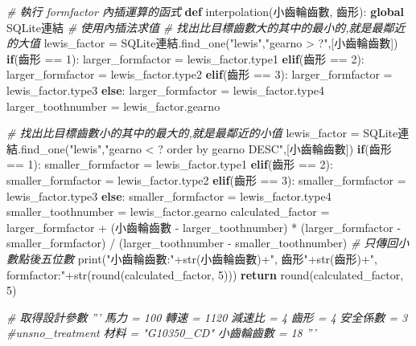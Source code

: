 \documentclass[]{article}
\newenvironment{Shaded}{}{}
\newcommand{\KeywordTok}[1]{\textcolor[rgb]{0.00,0.44,0.13}{\textbf{{#1}}}}
\newcommand{\DataTypeTok}[1]{\textcolor[rgb]{0.56,0.13,0.00}{{#1}}}
\newcommand{\DecValTok}[1]{\textcolor[rgb]{0.25,0.63,0.44}{{#1}}}
\newcommand{\StringTok}[1]{\textcolor[rgb]{0.25,0.44,0.63}{{#1}}}
\newcommand{\CommentTok}[1]{\textcolor[rgb]{0.38,0.63,0.69}{\textit{{#1}}}}
\newcommand{\NormalTok}[1]{{#1}}
\begin{document}
\begin{Shaded}
\begin{Highlighting}[]
\CommentTok{# 執行 formfactor 內插運算的函式}
\KeywordTok{def} \NormalTok{interpolation(小齒輪齒數, 齒形):}
    \KeywordTok{global} \NormalTok{SQLite連結}
    \CommentTok{# 使用內插法求值}
    \CommentTok{# 找出比目標齒數大的其中的最小的,就是最鄰近的大值}
    \NormalTok{lewis_factor = SQLite連結.find_one(}\StringTok{"lewis"}\NormalTok{,}\StringTok{"gearno > ?"}\NormalTok{,[小齒輪齒數])}
    \KeywordTok{if}\NormalTok{(齒形 == }\DecValTok{1}\NormalTok{):}
        \NormalTok{larger_formfactor = lewis_factor.type1}
    \KeywordTok{elif}\NormalTok{(齒形 == }\DecValTok{2}\NormalTok{):}
        \NormalTok{larger_formfactor = lewis_factor.type2}
    \KeywordTok{elif}\NormalTok{(齒形 == }\DecValTok{3}\NormalTok{):}
        \NormalTok{larger_formfactor = lewis_factor.type3}
    \KeywordTok{else}\NormalTok{:}
        \NormalTok{larger_formfactor = lewis_factor.type4}
    \NormalTok{larger_toothnumber = lewis_factor.gearno}

    \CommentTok{# 找出比目標齒數小的其中的最大的,就是最鄰近的小值}
    \NormalTok{lewis_factor = SQLite連結.find_one(}\StringTok{"lewis"}\NormalTok{,}\StringTok{"gearno < ? order by gearno DESC"}\NormalTok{,[小齒輪齒數])}
    \KeywordTok{if}\NormalTok{(齒形 == }\DecValTok{1}\NormalTok{):}
        \NormalTok{smaller_formfactor = lewis_factor.type1}
    \KeywordTok{elif}\NormalTok{(齒形 == }\DecValTok{2}\NormalTok{):}
        \NormalTok{smaller_formfactor = lewis_factor.type2}
    \KeywordTok{elif}\NormalTok{(齒形 == }\DecValTok{3}\NormalTok{):}
        \NormalTok{smaller_formfactor = lewis_factor.type3}
    \KeywordTok{else}\NormalTok{:}
        \NormalTok{smaller_formfactor = lewis_factor.type4}
    \NormalTok{smaller_toothnumber = lewis_factor.gearno}
    \NormalTok{calculated_factor = larger_formfactor + (小齒輪齒數 - larger_toothnumber) * (larger_formfactor - smaller_formfactor) / (larger_toothnumber - smaller_toothnumber)}
    \CommentTok{# 只傳回小數點後五位數}
    \DataTypeTok{print}\NormalTok{(}\StringTok{"小齒輪齒數:"}\NormalTok{+}\DataTypeTok{str}\NormalTok{(小齒輪齒數)+}\StringTok{", 齒形"}\NormalTok{+}\DataTypeTok{str}\NormalTok{(齒形)+}\StringTok{", formfactor:"}\NormalTok{+}\DataTypeTok{str}\NormalTok{(}\DataTypeTok{round}\NormalTok{(calculated_factor, }\DecValTok{5}\NormalTok{)))}
    \KeywordTok{return} \DataTypeTok{round}\NormalTok{(calculated_factor, }\DecValTok{5}\NormalTok{)}

\CommentTok{# 取得設計參數}
\CommentTok{'''}
\CommentTok{馬力 = 100}
\CommentTok{轉速 = 1120}
\CommentTok{減速比 = 4}
\CommentTok{齒形 = 4}
\CommentTok{安全係數 = 3}
\CommentTok{#unsno_treatment}
\CommentTok{材料 = "G10350_CD"}
\CommentTok{小齒輪齒數 = 18}
\CommentTok{'''}


\end{Highlighting}
\end{Shaded}
\end{document}
